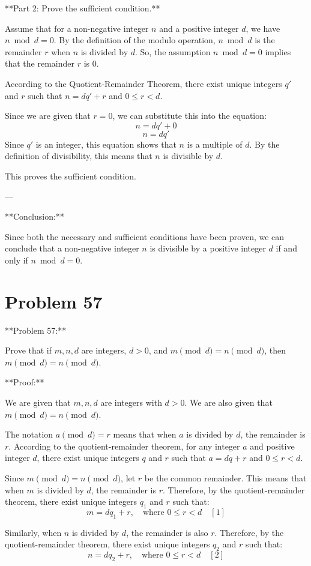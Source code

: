 \documentclass{article}
\begin{document}
**Part 2: Prove the sufficient condition.**

Assume that for a non-negative integer $n$ and a positive integer $d$, we have $n \bmod d = 0$.
By the definition of the modulo operation, $n \bmod d$ is the remainder $r$ when $n$ is divided by $d$.
So, the assumption $n \bmod d = 0$ implies that the remainder $r$ is 0.

According to the Quotient-Remainder Theorem, there exist unique integers $q'$ and $r$ such that $n = dq' + r$ and $0 \le r < d$.

Since we are given that $r=0$, we can substitute this into the equation:
$$ n = dq' + 0 $$
$$ n = dq' $$
Since $q'$ is an integer, this equation shows that $n$ is a multiple of $d$.
By the definition of divisibility, this means that $n$ is divisible by $d$.

This proves the sufficient condition.

---

**Conclusion:**

Since both the necessary and sufficient conditions have been proven, we can conclude that a non-negative integer $n$ is divisible by a positive integer $d$ if and only if $n \bmod d = 0$.

\newpage

\section*{Problem 57}
**Problem 57:**

Prove that if $m, n, d$ are integers, $d > 0$, and $m \pmod{d} = n \pmod{d}$, then $m \pmod{d} = n \pmod{d}$.

**Proof:**

We are given that $m, n, d$ are integers with $d > 0$.
We are also given that $m \pmod{d} = n \pmod{d}$.

The notation $a \pmod{d} = r$ means that when $a$ is divided by $d$, the remainder is $r$. According to the quotient-remainder theorem, for any integer $a$ and positive integer $d$, there exist unique integers $q$ and $r$ such that $a = dq + r$ and $0 \le r < d$.

Since $m \pmod{d} = n \pmod{d}$, let $r$ be the common remainder.
This means that when $m$ is divided by $d$, the remainder is $r$.
Therefore, by the quotient-remainder theorem, there exist unique integers $q_1$ and $r$ such that:
$$m = dq_1 + r, \quad \text{where } 0 \le r < d \quad [1]$$

Similarly, when $n$ is divided by $d$, the remainder is also $r$.
Therefore, by the quotient-remainder theorem, there exist unique integers $q_2$ and $r$ such that:
$$n = dq_2 + r, \quad \text{where } 0 \le r < d \quad [2]$$
\end{document}
